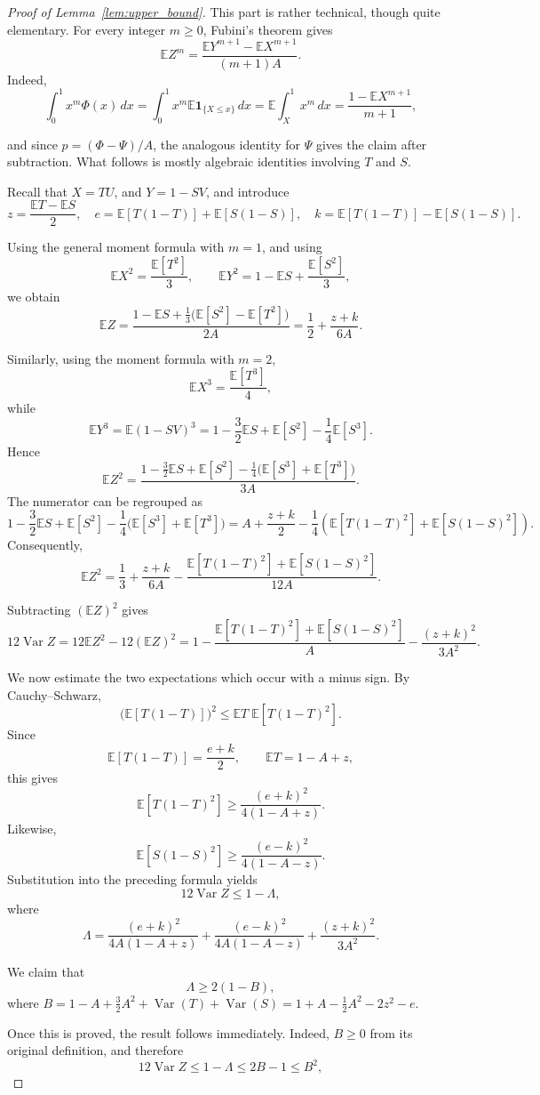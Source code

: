 \documentclass[10pt,a4paper]{amsart}
\newcommand{\E}{\mathbb E}
\newcommand{\Var}{\operatorname{Var}}
\begin{document}
\begin{proof}[Proof of Lemma~\ref{lem:upper_bound}]
This part is rather technical, though quite elementary. For every integer $m\ge0$, Fubini's theorem gives
$$
 \E Z^m
 =\frac{\E Y^{m+1}-\E X^{m+1}}{(m+1)A}.
$$
Indeed, 
$$
 \int_0^1x^m\Phi(x)\,dx = \int_0^1x^m\E\mathbf 1_{\{X\leq x\}}\,dx
 =\E\int_X^1x^m\,dx
 =\frac{1-\E X^{m+1}}{m+1},
$$


and since $p=(\Phi-\Psi)/A$, the analogous identity for $\Psi$ gives the claim after subtraction. What follows is mostly algebraic identities involving $T$ and $S$.

 Recall that $X = TU$, and $Y = 1 -SV$, and introduce
$$
 z=\frac{\E T-\E S}{2},\quad
 e=\E[T(1-T)]+\E[S(1-S)],\quad
 k=\E[T(1-T)]-\E[S(1-S)].
$$


Using the general moment formula with $m=1$, and using
$$
 \E X^2=\frac{\E[T^2]}{3},
 \qquad
 \E Y^2
 =1-\E S+\frac{\E[S^2]}{3},
$$
we obtain
$$
 \E Z
 =
 \frac{
  1-\E S+\frac13\bigl(\E[S^2]-\E[T^2]\bigr)
 }{2A} =\frac12+\frac{z+k}{6A}.
$$

Similarly, using the moment formula with $m=2$,
$$
 \E X^3=\frac{\E[T^3]}4,
$$
while
$$
 \E Y^3
 =
 \E(1-SV)^3
 =
 1-\frac32\E S+\E[S^2]-\frac14\E[S^3].
$$
Hence
$$
 \E Z^2
 =
 \frac{
  1-\frac32\E S+\E[S^2]
  -\frac14\bigl(\E[S^3]+\E[T^3]\bigr)
 }{3A}.
$$
The numerator can be regrouped as
$$
 1-\frac32\E S+\E[S^2]
  -\frac14\bigl(\E[S^3]+\E[T^3]\bigr) =
 A+\frac{z+k}{2}
 -\frac14\left(
   \E[T(1-T)^2]+\E[S(1-S)^2]
 \right). $$
Consequently,
$$
 \E Z^2
 =
 \frac13+\frac{z+k}{6A}
 -\frac{
   \E[T(1-T)^2]+\E[S(1-S)^2]
 }{12A}.
$$

Subtracting $(\E Z)^2$ gives
$$ 12\Var Z =
 12\E Z^2-12(\E Z)^2 = 1 -\frac{\E[T(1-T)^2]+\E[S(1-S)^2]}{A} -\frac{(z+k)^2}{3A^2}.$$

We now estimate the two expectations which occur with a minus sign.
By Cauchy--Schwarz,
$$
 \bigl(\E[T(1-T)]\bigr)^2
 \le
 \E T\;\E[T(1-T)^2].
$$
Since
$$
 \E[T(1-T)]=\frac{e+k}{2},
 \qquad
 \E T=1-A+z,
$$
this gives
$$
 \E[T(1-T)^2]
 \ge
 \frac{(e+k)^2}{4(1-A+z)}.
$$
Likewise,
$$
 \E[S(1-S)^2]
 \ge
 \frac{(e-k)^2}{4(1-A-z)}.
$$
Substitution into the preceding formula yields
$$
 12\Var Z\le 1-\Lambda,
$$
where
$$
 \Lambda=
 \frac{(e+k)^2}{4A(1-A+z)}
 +\frac{(e-k)^2}{4A(1-A-z)}
 +\frac{(z+k)^2}{3A^2}.
$$


We claim that
$$
 \Lambda\ge2(1-B),
$$
where $B=1-A+\frac{3}{2}A^2 + \Var(T) + \Var(S) = 1+A-\frac{1}{2}A^2-2z^2-e$.
\par Once this is proved, the result follows immediately. Indeed, $B\ge0$ from its original definition, and therefore
$$
 12\Var Z\le1-\Lambda\le2B-1\le B^2,
$$


\end{proof}
\end{document}
